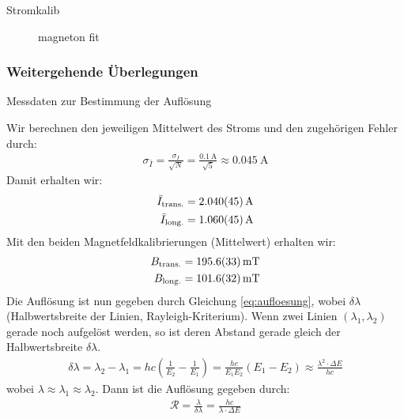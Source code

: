 \documentclass[11pt, a4paper]{article}
\begin{document}
\begin{table}[h]
	\centering
	
	\caption{Stromkalib}
	\label{tab:mittelwert_kalibration}
\end{table}


\begin{figure}[h]
	\centering
	
	\caption{magneton fit}
	\label{fig:magneton_fit}
\end{figure}


\subsubsection{Weitergehende Überlegungen}

\begin{table}[h]
	\centering
	
	\caption{Messdaten zur Bestimmung der Auflösung}
	\label{tab:aufloesung}
\end{table}
Wir berechnen den jeweiligen Mittelwert des Stroms und den zugehörigen Fehler durch:
\begin{align}
	\sigma_{\bar{I}} = \frac{\sigma_I}{\sqrt{N}} = \frac{\SI{0,1}{\ampere}}{\sqrt{5}} \approx \SI{0,045}{\ampere}
\end{align}
Damit erhalten wir:
\begin{align}
	\bar{I}_\mathrm{trans.} = \SI{2.040 +- 0.045}{\ampere} \\
	\bar{I}_\mathrm{long.} = \SI{1.060 +- 0.045}{\ampere}
\end{align}
Mit den beiden Magnetfeldkalibrierungen (Mittelwert) erhalten wir:
\begin{align}
	B_\mathrm{trans.} = \SI{195.6 +- 3.3}{\milli\tesla} \\
	B_\mathrm{long.} = \SI{101.6 +- 3.2}{\milli\tesla}
\end{align}
Die Auflösung ist nun gegeben durch Gleichung \ref{eq:aufloesung}, wobei $\delta \lambda$ (Halbwertsbreite der Linien, Rayleigh-Kriterium).
Wenn zwei Linien $(\lambda_1, \lambda_2)$ gerade noch aufgelöst werden, so ist deren Abstand gerade gleich der Halbwertsbreite $\delta \lambda$.
\begin{align}
	\delta \lambda = \lambda_2 - \lambda_1 = h c \left( \frac{1}{E_2} - \frac{1}{E_1} \right) = \frac{h c}{E_1 E_2} \left(E_1 - E_2\right) \approx \frac{\lambda^2 \cdot \Delta E}{h c}
\end{align}
wobei $\lambda \approx \lambda_1 \approx \lambda_2$.
Dann ist die Auflösung gegeben durch:
\begin{align}
	\mathcal{R} = \frac{\lambda}{\delta \lambda} = \frac{h c}{\lambda \cdot \Delta E}
\end{align}
\end{document}
